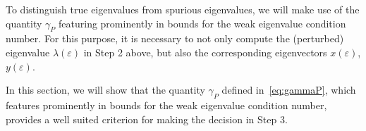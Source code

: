 \documentclass[12pt]{article}
\begin{document}
To distinguish true eigenvalues from spurious eigenvalues, we will make use of the quantity 
$
    \gamma_P 
$
featuring prominently in bounds for the weak eigenvalue condition number. For this purpose, it is necessary to not only compute the (perturbed) eigenvalue $\lambda(\varepsilon)$ in Step 2 above, but also the corresponding eigenvectors $x(\varepsilon)$, $y(\varepsilon)$.


In this section, we will show that the quantity $\gamma_P$ defined in~\eqref{eq:gammaP}, which features prominently in bounds for the weak eigenvalue condition number, provides a well suited criterion for making the decision in Step 3. 


\end{document}
